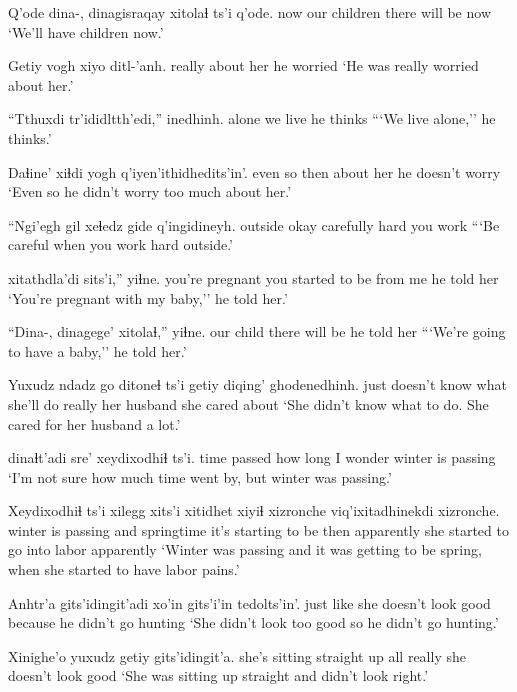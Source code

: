 \documentclass[12pt]{article}
\begin{document}
\gll Q'ode dina-, dinagisraqay xitolaɬ       ts'i q'ode.
now   {}     {our children} {there will be} {}     now
\glt `We'll have children now.'
\glend

\gll Getiy  vogh      {xiyo ditl-'anh.} 
really {about her} {he worried}      
\glt `He was really worried about her.'
\glend

\gll ``Tthuxdi tr'ididltth'edi,'' inedhinh.
alone   {we live}         {he thinks}
\glt ```We live alone,'' he thinks.'
\glend

\gll Daɬine' xiɬdi yogh      {q'iyen'ithidhedits'in'.}
{even so} then  {about her} {he doesn't worry}
\glt `Even so he didn't worry too much about her.'
\glend

\gll ``Ngi'egh gil xeɬedz  gide  q'ingidineyh. 
outside  okay  carefully hard {you work}     
\glt ```Be careful when you work hard outside.'
\glend

 xitathdla'di  sits'i,''  yiɬne.
{you're pregnant} {you started to be} {from me} {he told her}
\glt `You're pregnant with my baby,'' he told her.'
\glend

\gll ``Dina-, dinagege' xitolaɬ,''       yiɬne.
{}      {our child} {there will be} {he told her}
\glt ```We're going to have a baby,'' he told her.'
\glend

\gll Yuxudz {ndadz go} ditoneɬ ts'i getiy  diqing'     ghodenedhinh.
just     {doesn't know what} {she'll do} {} really {her husband} {she cared about}
\glt `She didn't know what to do. She cared for her husband a lot.'
\glend

 dinaɬt'adi sre'         xeydixodhiɬ ts'i.
{time passed}   {how long} {I wonder} {winter is passing}
\glt `I'm not sure how much time went by, but winter was passing.'
\glend

\gll Xeydixodhiɬ        ts'i xilegg {xits'i xitidhet}       xiyiɬ xizronche viq'ixitadhinekdi xizronche.
{winter is passing} and  springtime {it's starting to be} then apparently    {she started to go into labor} apparently
\glt `Winter was passing and it was getting to be spring, when she started to have labor pains.'
\glend

\gll Anhtr'a   gits'idingit'adi xo'in {gits'i'in tedolts'in'.}
{just like} {she doesn't look good} because {he didn't go hunting}
\glt `She didn't look too good so he didn't go hunting.'
\glend

\gll Xinighe'o                 yuxudz getiy  gits'idingit'a.
{she's sitting straight up} all  really {she doesn't look good}
\glt `She was sitting up straight and didn't look right.'
\glend
\end{document}
